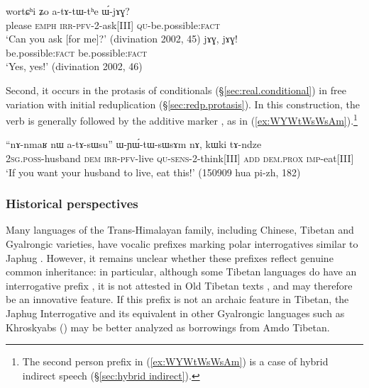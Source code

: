 \begin{exe}
\ex 
\begin{xlist}
\ex \label{ex:atAtWthe.WjAG}
 \gll wortɕʰi ʑo a-tɤ-tɯ-tʰe ɯ́-jɤɣ? \\
please \textsc{emph} \textsc{irr}-\textsc{pfv}-2-ask[III] \textsc{qu}-be.possible:\textsc{fact} \\ 
\glt `Can you ask [for me]?' (divination 2002, 45)
\ex \label{ex:jAG.jAG}
 \gll jɤɣ, jɤɣ! \\
be.possible:\textsc{fact} be.possible:\textsc{fact} \\ 
\glt `Yes, yes!' (divination 2002, 46)
\end{xlist}
\end{exe}

Second, it occurs in the protasis of conditionals (§\ref{sec:real.conditional}) in free variation with initial reduplication (§\ref{sec:redp.protasis}). In this construction, the verb is generally followed by the additive marker , as in (\ref{ex:WYWtWsWsAm}).\footnote{The second person prefix  in (\ref{ex:WYWtWsWsAm}) is a case of hybrid indirect speech (§\ref{sec:hybrid indirect}). }
 
\begin{exe}
\ex \label{ex:WYWtWsWsAm}
 \gll ``nɤ-nmaʁ nɯ a-tɤ-sɯsu'' ɯ-ɲɯ́-tɯ-sɯsɤm nɤ, kɯki tɤ-ndze \\
 \textsc{2sg}.\textsc{poss}-husband \textsc{dem} \textsc{irr}-\textsc{pfv}-live \textsc{qu}-\textsc{sens}-2-think[III] \textsc{add} \textsc{dem}.\textsc{prox} \textsc{imp}-eat[III] \\
\glt `If you want your husband to live, eat this!' (150909 hua pi-zh, 182)
\end{exe}

\subsubsection{Historical perspectives} \label{sec:interrogative.e.history}

Many languages of the Trans-Himalayan family, including Chinese, Tibetan and Gyalrongic varieties, have vocalic prefixes marking polar interrogatives similar to Japhug  \citep{sunhk96yiwen}. However, it remains unclear whether these prefixes reflect genuine common inheritance: in particular, although some Tibetan languages do have an interrogative prefix , it is not attested in Old Tibetan texts \citep{hoshi12e}, and may therefore be an innovative feature. If this prefix is not an archaic feature in Tibetan,  the Japhug Interrogative  and its equivalent in other Gyalrongic languages such as Khroskyabs  (\citealt[340]{lai17khroskyabs}) may be better analyzed as borrowings from Amdo Tibetan.


